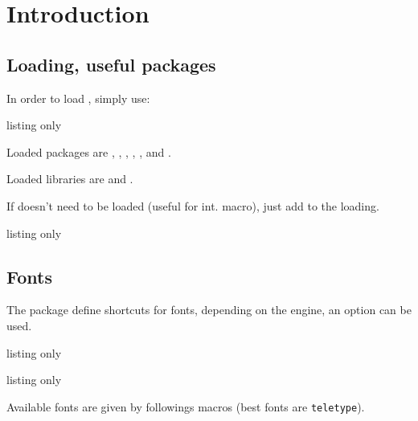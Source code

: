 \documentclass[11pt,a4paper]{ltxdoc}
\begin{document}
\section{Introduction}

\subsection{Loading, useful packages}

In order to load , simply use:

\begin{DemoCode}{listing only}
\usepackage{calculatoritems}
\end{DemoCode}

Loaded packages are , , , , ,  and .

Loaded libraries are  and .

\smallskip

If  doesn't need to be loaded (useful for int. macro), just add \ShowCode{[noamssymb]} to the loading.

\begin{DemoCode}{listing only}
\usepackage[noamssymb]{calculatoritems}
\end{DemoCode}

\subsection{Fonts}

The package define shortcuts for fonts, depending on the engine, an option \ShowCode{[xelua]} can be used.

\begin{DemoCode}{listing only}
\usepackage{calculatoritems}
\end{DemoCode}

\begin{DemoCode}{listing only}
\usepackage[xelua]{calculatoritems}
\end{DemoCode}

Available fonts are given by followings macros (best fonts are \texttt{teletype}).

\begin{DemoCode}{listing only}
\newcommand\fontNWKS\fontencoding{T1}\selectfont} %
\newcommand\fontCASIOA{%
  \fontencoding{T1}\fontfamily{AnonymousPro}\fontseries{sb}\selectfont %
}
\newcommand\fontCASIOB{%
  \fontencoding{T1}\fontfamily{AlegreyaSans-TLF}\fontseries{sb}\selectfont %
}
\newcommand\fontTI{%
  \fontencoding{T1}\fontfamily{AnonymousPro}\fontseries{sb}\selectfont %
}
\newcommand\fontHP{%
  \fontencoding{T1}\fontfamily{AlegreyaSans-TLF}\fontseries{sb}\selectfont %
}
\newcommand\fontKEY{%
  \fontencoding{T1}\fontfamily{SourceCodePro-TLF}\fontseries{sb}\selectfont %
}
\end{DemoCode}
\end{document}
